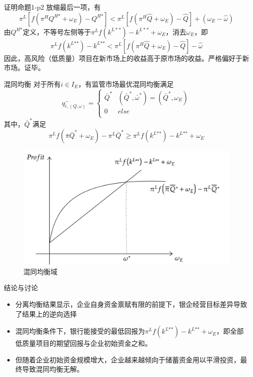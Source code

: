 \documentclass{beamer}
\begin{document}
\begin{frame}{证明命题1-p2}
	放缩最后一项，有
	$${{\pi }^{L}}\left[ f\left( {{\pi }^{H}}{{Q}^{H\text{*}}}+{{\omega }_{E}} \right)-{{Q}^{H\text{*}}} \right]<{{\pi }^{L}}\left[ f\left( {{\pi }^{H}}\hat{Q}+{{\omega }_{E}} \right)-\hat{Q} \right]+\left( {{\omega }_{E}}-\hat{\omega } \right)$$
	由${Q}^{H\text{*}}$定义，不等号左侧等于$ {{\pi }^{L}}f\left( {{k}^{L**}} \right)-{{k}^{L**}}+{{\omega }_{E}} $，消去$ {\omega }_{E} $，即
	$${{\pi }^{L}}f\left( {{k}^{L\text{**}}} \right)-{{k}^{L\text{**}}}<{{\pi }^{L}}\left[ f\left( {{\pi }^{H}}\hat{Q}+{{\omega }_{E}} \right)-\hat{Q} \right]-\hat{\omega }$$
	因此，高风险（低质量）项目在新市场上的收益高于原市场的收益。严格偏好于新市场。证毕。
\end{frame}

\begin{frame}{混同均衡}
	对于所有$i\in I_E$，有监管市场最优混同均衡满足
	$$q_{i,\left( Q,\omega  \right)}^{-}=\left\{ \begin{matrix}
		{{{\bar{Q}}}^{\text{*}}} & \left( {{{\bar{Q}}}^{\text{*}}},{{{\bar{\omega }}}^{\text{*}}} \right)=\left( {{{\bar{Q}}}^{\text{*}}},{{\omega }_{E}} \right)  \\
		0 &  else \\
	\end{matrix} \right.$$
	其中，$ {{\bar{Q}}}^{\text{*}} $满足
	$${{\pi }^{L}}f\left( \bar{\pi }{{{\bar{Q}}}^{\text{*}}}+{{\omega }_{E}} \right)-{{\pi }^{L}}{{\bar{Q}}^{\text{*}}}\ge {{\pi }^{L}}f\left( {{k}^{L\text{**}}} \right)-{{k}^{L\text{**}}}+{{\omega }_{E}}$$
		\begin{figure}[htpb]
		\centering
		\includegraphics[width=0.5\linewidth]{pic/pool.png}
		\caption{混同均衡域}
	\end{figure}
\end{frame}

\begin{frame}{结论与讨论}
	\begin{itemize}
		\item 分离均衡结果显示，企业自身资金禀赋有限的前提下，银企经营目标差异导致了结果上的逆向选择
		\item 混同均衡条件下，银行能接受的最低回报为${{\pi }^{L}}f\left( {{k}^{L\text{**}}} \right)-{{k}^{L\text{**}}}+{{\omega }_{E}}$，即全部低质量项目的期望回报与企业初始资金之和。
		\item 但随着企业初始资金规模增大，企业越来越倾向于储蓄资金用以平滑投资，最终导致混同均衡无解。
	\end{itemize}
\end{frame}
\end{document}
